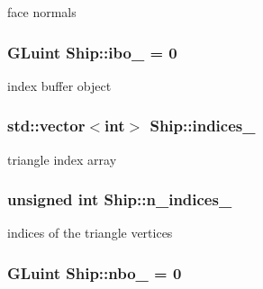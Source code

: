 face normals 

\subsubsection[{\texorpdfstring{ibo\+\_\+}{ibo_}}]{\setlength{\rightskip}{0pt plus 5cm}G\+Luint Ship\+::ibo\+\_\+ = 0\hspace{0.3cm}{\ttfamily [private]}}\hypertarget{classShip_ab2ccb1ba2674e0eb61df65d278ab2b5e}{}\label{classShip_ab2ccb1ba2674e0eb61df65d278ab2b5e}


index buffer object 

\subsubsection[{\texorpdfstring{indices\+\_\+}{indices_}}]{\setlength{\rightskip}{0pt plus 5cm}std\+::vector$<$int$>$ Ship\+::indices\+\_\+\hspace{0.3cm}{\ttfamily [private]}}\hypertarget{classShip_af738fb884346cf28830f326a10d998fd}{}\label{classShip_af738fb884346cf28830f326a10d998fd}


triangle index array 

\subsubsection[{\texorpdfstring{n\+\_\+indices\+\_\+}{n_indices_}}]{\setlength{\rightskip}{0pt plus 5cm}unsigned int Ship\+::n\+\_\+indices\+\_\+\hspace{0.3cm}{\ttfamily [private]}}\hypertarget{classShip_a16d302502e0fd72f2f550deb8d7a94b3}{}\label{classShip_a16d302502e0fd72f2f550deb8d7a94b3}


indices of the triangle vertices 

\subsubsection[{\texorpdfstring{nbo\+\_\+}{nbo_}}]{\setlength{\rightskip}{0pt plus 5cm}G\+Luint Ship\+::nbo\+\_\+ = 0\hspace{0.3cm}{\ttfamily [private]}}\hypertarget{classShip_a85444653cb93dfc74c3193277c8cd581}{}\label{classShip_a85444653cb93dfc74c3193277c8cd581}


